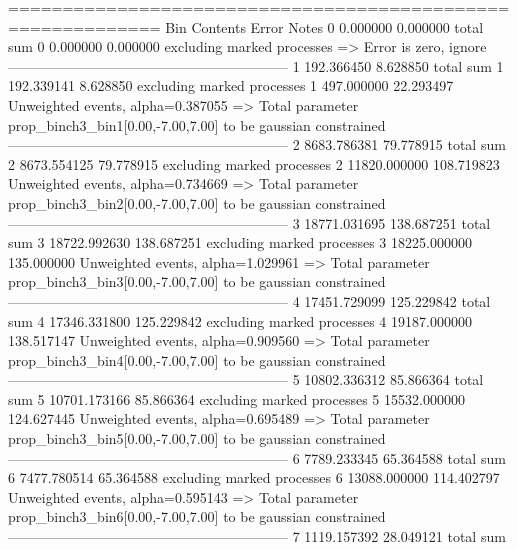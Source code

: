 ============================================================
Bin        Contents        Error           Notes                         
0          0.000000        0.000000        total sum                     
0          0.000000        0.000000        excluding marked processes    
  => Error is zero, ignore      
------------------------------------------------------------
1          192.366450      8.628850        total sum                     
1          192.339141      8.628850        excluding marked processes    
1          497.000000      22.293497       Unweighted events, alpha=0.387055
  => Total parameter prop_binch3_bin1[0.00,-7.00,7.00] to be gaussian constrained
------------------------------------------------------------
2          8683.786381     79.778915       total sum                     
2          8673.554125     79.778915       excluding marked processes    
2          11820.000000    108.719823      Unweighted events, alpha=0.734669
  => Total parameter prop_binch3_bin2[0.00,-7.00,7.00] to be gaussian constrained
------------------------------------------------------------
3          18771.031695    138.687251      total sum                     
3          18722.992630    138.687251      excluding marked processes    
3          18225.000000    135.000000      Unweighted events, alpha=1.029961
  => Total parameter prop_binch3_bin3[0.00,-7.00,7.00] to be gaussian constrained
------------------------------------------------------------
4          17451.729099    125.229842      total sum                     
4          17346.331800    125.229842      excluding marked processes    
4          19187.000000    138.517147      Unweighted events, alpha=0.909560
  => Total parameter prop_binch3_bin4[0.00,-7.00,7.00] to be gaussian constrained
------------------------------------------------------------
5          10802.336312    85.866364       total sum                     
5          10701.173166    85.866364       excluding marked processes    
5          15532.000000    124.627445      Unweighted events, alpha=0.695489
  => Total parameter prop_binch3_bin5[0.00,-7.00,7.00] to be gaussian constrained
------------------------------------------------------------
6          7789.233345     65.364588       total sum                     
6          7477.780514     65.364588       excluding marked processes    
6          13088.000000    114.402797      Unweighted events, alpha=0.595143
  => Total parameter prop_binch3_bin6[0.00,-7.00,7.00] to be gaussian constrained
------------------------------------------------------------
7          1119.157392     28.049121       total sum                     
